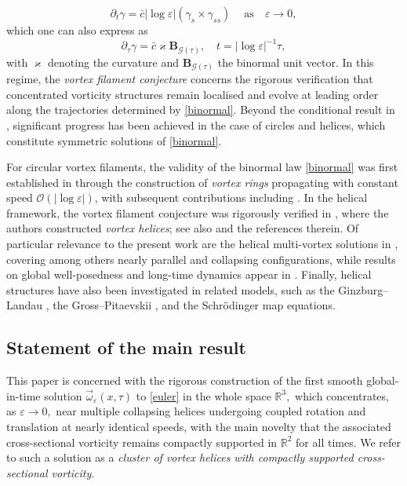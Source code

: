 \documentclass[11pt,reqno,a4paper]{amsart}
\numberwithin{equation}{section}
\newcommand{\R}{\mathbb{R}}
\newcommand{\ve}{\varepsilon}
\begin{document}
\[\partial_{t}\gamma=\bar{c}|\log\ve|\left(\gamma_{s}\times\gamma_{ss}\right)\ \quad \text{as}\quad \ve\to 0,\]
which one can also express as
\begin{equation}\label{binormal}
\partial_{\tau}\gamma=\bar{c}\varkappa\mathbf{B}_{{\mathcal{G}(\tau)}}, \quad t = |\log\ve|^{-1}\tau,
\end{equation}
with $\varkappa$ denoting the curvature and $\mathbf{B}_{\mathcal{G}(\tau)}$ the binormal unit vector. In this regime, the \emph{vortex filament conjecture} concerns the rigorous verification that concentrated vorticity structures remain localised and evolve at leading order along the trajectories determined by \eqref{binormal}. Beyond the conditional result in \cite{MR3609248}, significant progress has been achieved in the case of circles and helices, which constitute symmetric solutions of \eqref{binormal}.

For circular vortex filaments, the validity of the binormal law \eqref{binormal} was first established in \cite{fraenkel1970steady} through the construction of \emph{vortex rings} propagating with constant speed $\mathcal{O}\left(|\log\ve|\right)$, with subsequent  contributions including \cites{MR3101789,MR422916,MR1738349,MR4404610, guo2026global}. In the helical framework, the vortex filament conjecture was rigorously verified in \cite{MR4417384}, where the authors constructed \emph{vortex helices}; see also \cites{qin2024concentrated,MR4555251,MR4534710,MR5036920} and the references therein. Of particular relevance to the present work are the helical multi-vortex solutions in \cites{MR4899797,cao2023clustered,MR5030554,cao2025co,donati2024dynamics}, covering among others nearly parallel and collapsing configurations, while results on global well-posedness and long-time dynamics appear in  \cites{MR4809294,guo2024long,MR3320529}. Finally, helical structures have also been investigated in related models, such as the Ginzburg–Landau  \cites{MR4493621,DUAN2026114325}, the Gross–Pitaevskii  \cites{MR2181460,MR4540752}, and the Schrödinger map \cite{MR3449250} equations. 
\subsection{Statement of the main result}
This paper is concerned with the rigorous construction of the first smooth global-in-time solution $\vec{\omega}_{\ve}(x,\tau)$ to \eqref{euler} in the whole space $\R^3,$ which concentrates, as $\ve \to 0,$ near multiple collapsing helices undergoing coupled rotation and translation at nearly identical speeds, with the main novelty that the associated cross-sectional vorticity remains compactly supported in $\R^2$ for all times. We refer to such a solution as a \emph{cluster of vortex helices with compactly supported cross-sectional vorticity}.
\end{document}
